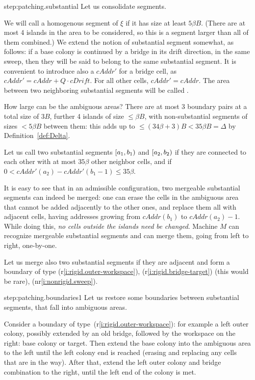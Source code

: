 \documentclass[12pt]{memoir}
\newcommand{\fld}[1]{\ensuremath{\textit{#1}}}
\def\B{B}
\newcommand{\cAddr}{\fld{cAddr}}
\newcommand{\cDrift}{\fld{cDrift}}
\begin{document}
\begin{Proof}
\begin{step+}{step:patching.substantial}
Let us consolidate segments.
\end{step+}
\begin{prooofi}
We will call a homogenous segment of \( \xi \)  if it has size 
at least \( 5\beta\B \).
(There are at most 4 islands in the area to be considered, so this is a segment 
larger than all of them combined.)
We extend the notion of substantial segment somewhat, as follows: 
if a base colony is continued by a bridge 
in its drift direction, in the same sweep, then they will be said to
belong to the same substantial segment.
It is convenient to 
introduce also a  \( \cAddr' \) for a bridge cell,
as \( \cAddr'=\cAddr+Q\cdot\cDrift \).
For all other cells, \( \cAddr'=\cAddr \).
The area between two neighboring substantial segments will be called .

How large can be the ambiguous areas?
There are at most 3 boundary pairs at a total size of \( 3\B \), 
further 4 islands of size \( \le\beta\B \), with non-substantial segments of sizes \( < 5\beta\B \)
between them: this adds up to \( \le (34\beta+3)\B<35\beta\B=\Delta \) 
by Definition~\ref{def:Delta}.

Let us call two substantial  segments \( [a_{1},b_{1}) \) and \( [a_{2},b_{2}) \)
 if they are connected to each other with at most
\( 35\beta \) other neighbor cells, and if \( 0<\cAddr'(a_{2})-\cAddr'(b_{1}-1)\le 35\beta \).

It is easy to see that in an admissible configuration, two mergeable substantial segments can indeed
be merged: one can erase the cells in the ambiguous area
that cannot be added adjacently to the other ones, and replace them all with adjacent cells,
having addresses growing from \( \cAddr(b_{1}) \) to \( \cAddr(a_{2})-1 \).
While doing this, \emph{no cells outside the islands need be changed}.
Machine \( M \) can recognize mergeable substantial segments and can merge them, going from left to 
right, one-by-one.

Let us merge also two substantial segments if they are adjacent and form a boundary of type
(r\ref{i:rigid.outer-workspace}), (r\ref{i:rigid.bridge-target}) (this would be rare),
(nr\ref{i:nonrigid.sweep}).
\end{prooofi} %

\begin{step+}{step:patching.boundaries1}
Let us restore some boundaries between substantial segments,
that fall into ambiguous areas.
\end{step+}
\begin{prooofi}
Consider a boundary of type~(r\ref{i:rigid.outer-workspace}): for example
a left outer colony, possibly extended by an old bridge,
followed by the workspace on the right: base colony or target.
Then extend the base colony into the ambiguous area
to the left until the left colony end is reached
(erasing and replacing any cells that are in the way).
After that, extend the left outer colony and bridge combination to the right, until
the left end of the colony is met.


\end{prooofi}
\end{Proof}
\end{document}
